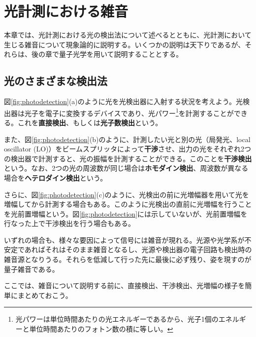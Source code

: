 \chapter{光計測における雑音}

本章では、光計測における光の検出法について述べるとともに、光計測において生じる雑音について現象論的に説明する。いくつかの説明は天下りであるが、それらは、後の章で量子光学を用いて説明することとする。

\section{光のさまざまな検出法}\label{section:noise_in_optical_measurement}


図\ref{fig:photodetection}(a)のように光を光検出器に入射する状況を考えよう。光検出器は光子を電子に変換するデバイスであり、光パワー\footnote{光パワーは単位時間あたりの光エネルギーであるから、光子1個のエネルギーと単位時間あたりのフォトン数の積に等しい。}を計測することができる。これを\textbf{直接検出}、もしくは\textbf{光子数検出}という。

また、図\ref{fig:photodetection}(b)のように、計測したい光と別の光（局発光、local oscillator (LO)）をビームスプリッタによって\textbf{干渉}させ、出力の光をそれぞれ2つの検出器で計測すると、光の振幅を計測することができる。このことを\textbf{干渉検出}という。なお、2つの光の周波数が同じ場合は\textbf{ホモダイン検出}、周波数が異なる場合を\textbf{ヘテロダイン検出}という。

さらに、図\ref{fig:photodetection}(c)のように、光検出の前に光増幅器を用いて光を増幅してから計測する場合もある。このように光検出の直前に光増幅を行うことを光前置増幅という。図\ref{fig:photodetection}には示していないが、光前置増幅を行なった上で干渉検出を行う場合もある。

いずれの場合も、様々な要因によって信号には雑音が現れる。光源や光学系が不安定であればそれはそのまま雑音となるし、光源や検出器の電子回路も検出時の雑音源となりうる。それらを低減して行った先に最後に必ず残り、姿を現すのが量子雑音である。

ここでは、雑音について説明する前に、直接検出、干渉検出、光増幅の様子を簡単にまとめておこう。

